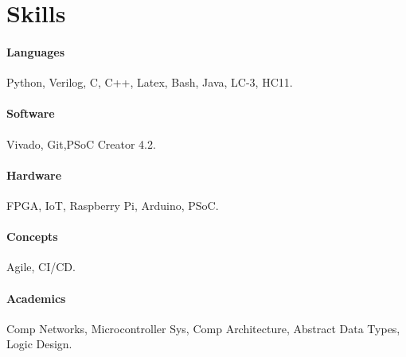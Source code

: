 \documentclass[12pt,letterpaper]{report}
\newcommand{\verticalgap}{2em}
\newcommand{\verticalskillgap}{.2em}
\newcommand{\skillspace}{0.35em}
\newcommand{\rightcolumn}{0.21\linewidth}
\begin{document}
% 
	\begin{minipage}[t]{\rightcolumn}
		\vspace{\verticalgap}
	\section*{Skills}
	\vspace{\verticalskillgap}
    \raggedright
    \paragraph*{Languages}
		Python, Verilog, C, C++, Latex, Bash, Java, LC-3, HC11. 
	\vspace{\skillspace}
	\paragraph*{Software}
		Vivado, Git,\newline PSoC Creator 4.2.
	\vspace{\skillspace}
    \paragraph*{Hardware}
		 FPGA, IoT, Raspberry Pi, Arduino, PSoC.
	\vspace{\skillspace}
	\paragraph*{Concepts}
	Agile, CI/CD.
	\vspace{\skillspace}
	\paragraph*{Academics}
	Comp Networks,
	Microcontroller Sys,
	Comp Architecture,
	Abstract Data Types,
	Logic Design.
    
	\end{minipage}
%	
\end{document}
